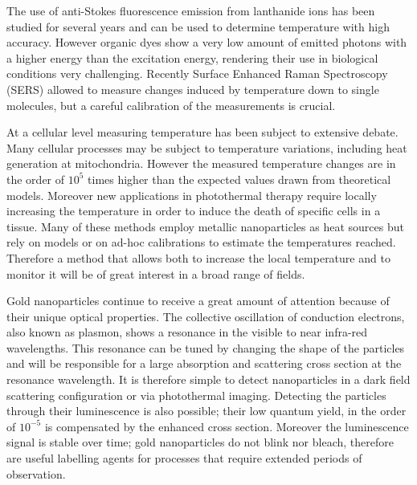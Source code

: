 The use of anti-Stokes fluorescence emission from lanthanide ions has been
studied for several years\cite{Auzel2004a} and can be used to determine
temperature with high accuracy. However organic dyes show a very low amount of
emitted photons with a higher energy than the excitation energy, rendering their
use in biological conditions very challenging. Recently Surface Enhanced Raman
Spectroscopy (SERS) allowed to measure changes induced by temperature down
to single molecules\cite{Pozzi2015}, but a careful calibration of the
measurements is crucial.

At a cellular level measuring temperature has been subject to extensive
debate\cite{Yang2011a,Suzuki2015}. Many cellular processes may be subject to
temperature variations, including heat generation at mitochondria. However the
measured temperature changes\cite{Yang2011a} are in the order of $10^5$ times
higher than the expected values drawn from theoretical models\cite{Sato2014}.
Moreover new applications in photothermal therapy require locally increasing the
temperature in order to induce the death of specific cells in a
tissue\cite{Huang2008,Huang2006}. Many of these methods employ metallic
nanoparticles as heat sources\cite{Gobin2007,Hirsch2003} but rely on
models\cite{Zhao2014a} or on ad-hoc calibrations to estimate the temperatures
reached\cite{Donner2013}. Therefore a method that allows both to increase the
local temperature and to monitor it will be of great interest in a broad range
of fields.

Gold nanoparticles continue to receive a great amount of attention because of
their unique optical properties\cite{Zijlstra2011}. The collective oscillation
of conduction electrons, also known as plasmon, shows a resonance in the visible to
near infra-red wavelengths. This resonance can be tuned by changing the shape of
the particles\cite{Carattino2016} and will be responsible for a large absorption
and scattering cross section at the resonance wavelength. It is therefore simple
to detect nanoparticles in a dark field scattering\cite{Hu2008} configuration or
via photothermal imaging\cite{Berciaud2006}. Detecting the particles through
their luminescence\cite{Tcherniak2011} is also possible; their low quantum
yield\cite{Fang2012,Rao2015,Yorulmaz2012,Cheng2015}, in the order of $10^{-5}$
is compensated by the enhanced cross section. Moreover the luminescence signal
is stable over time; gold nanoparticles do not blink nor bleach, therefore are 
useful labelling agents for processes that require extended periods of
observation\cite{Wang2005}.

